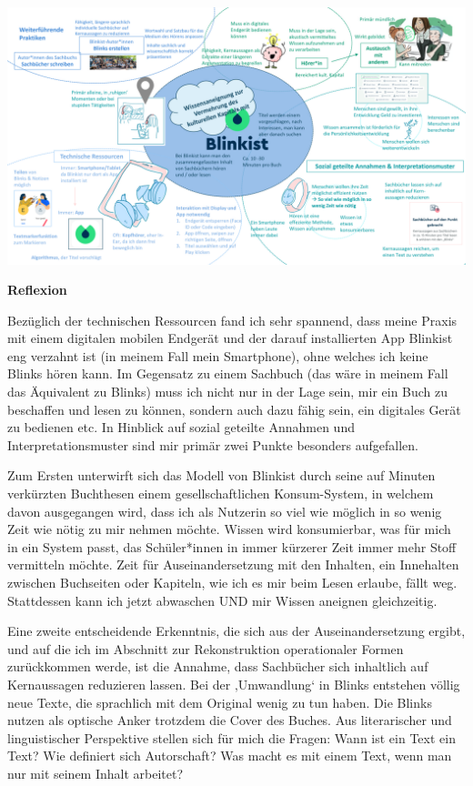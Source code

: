 \documentclass[
  a4paper,
]{book}
\begin{document}
\begin{center}\includegraphics{Figures/05-Bsp.-Blinkist} \end{center}

\textbf{Reflexion}

Bezüglich der technischen Ressourcen fand ich sehr spannend, dass meine Praxis mit einem digitalen mobilen Endgerät und der darauf installierten App Blinkist eng verzahnt ist (in meinem Fall mein Smartphone), ohne welches ich keine Blinks hören kann. Im Gegensatz zu einem Sachbuch (das wäre in meinem Fall das Äquivalent zu Blinks) muss ich nicht nur in der Lage sein, mir ein Buch zu beschaffen und lesen zu können, sondern auch dazu fähig sein, ein digitales Gerät zu bedienen etc.
In Hinblick auf sozial geteilte Annahmen und Interpretationsmuster sind mir primär zwei Punkte besonders aufgefallen.

Zum Ersten unterwirft sich das Modell von Blinkist durch seine auf Minuten verkürzten Buchthesen einem gesellschaftlichen Konsum-System, in welchem davon ausgegangen wird, dass ich als Nutzerin so viel wie möglich in so wenig Zeit wie nötig zu mir nehmen möchte. Wissen wird konsumierbar, was für mich in ein System passt, das Schüler*innen in immer kürzerer Zeit immer mehr Stoff vermitteln möchte. Zeit für Auseinandersetzung mit den Inhalten, ein Innehalten zwischen Buchseiten oder Kapiteln, wie ich es mir beim Lesen erlaube, fällt weg.
Stattdessen kann ich jetzt abwaschen UND mir Wissen aneignen gleichzeitig.

Eine zweite entscheidende Erkenntnis, die sich aus der Auseinandersetzung ergibt, und auf die ich im Abschnitt zur Rekonstruktion operationaler Formen zurückkommen werde, ist die Annahme, dass Sachbücher sich inhaltlich auf Kernaussagen reduzieren lassen. Bei der ‚Umwandlung` in Blinks entstehen völlig neue Texte, die sprachlich mit dem Original wenig zu tun haben. Die Blinks nutzen als optische Anker trotzdem die Cover des Buches. Aus literarischer und linguistischer Perspektive stellen sich für mich die Fragen: Wann ist ein Text ein Text? Wie definiert sich Autorschaft? Was macht es mit einem Text, wenn man nur mit seinem Inhalt arbeitet?
\end{document}
